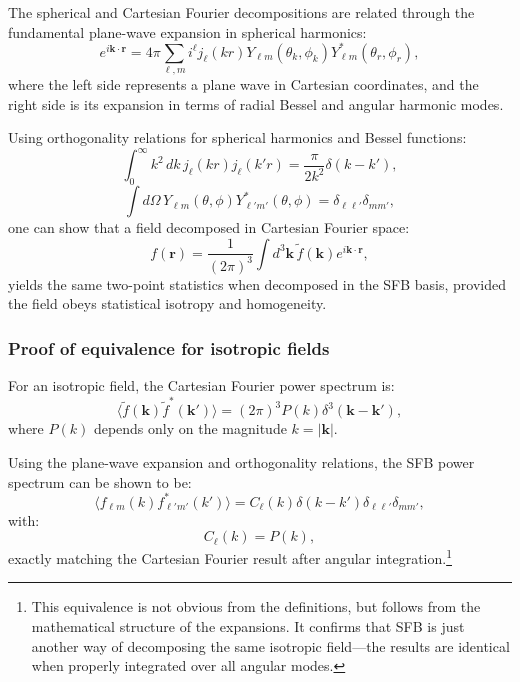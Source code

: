 The spherical and Cartesian Fourier decompositions are related through the fundamental plane-wave expansion in spherical harmonics:
\begin{equation}
e^{i\mathbf{k} \cdot \mathbf{r}} = 4\pi \sum_{\ell,m} i^\ell j_\ell(kr) Y_{\ell m}(\theta_k, \phi_k) Y_{\ell m}^*(\theta_r, \phi_r),
\label{eq:plane_wave_expansion}
\end{equation}
where the left side represents a plane wave in Cartesian coordinates, and the right side is its expansion in terms of radial Bessel
and angular harmonic modes.

Using orthogonality relations for spherical harmonics and Bessel functions:
\begin{equation}
\int_0^\infty k^2 \, dk \, j_\ell(kr) j_\ell(k'r) = \frac{\pi}{2k^2} \delta(k - k'),
\label{eq:bessel_orthonormality}
\end{equation}
\begin{equation}
\int d\Omega \, Y_{\ell m}(\theta, \phi) Y_{\ell' m'}^*(\theta, \phi) = \delta_{\ell\ell'} \delta_{mm'},
\label{eq:harmonic_orthonormality}
\end{equation}
one can show that a field decomposed in Cartesian Fourier space:
\begin{equation}
f(\mathbf{r}) = \frac{1}{(2\pi)^3} \int d^3\mathbf{k} \, \tilde{f}(\mathbf{k}) e^{i\mathbf{k} \cdot \mathbf{r}},
\label{eq:cartesian_decomposition_proof}
\end{equation}
yields the same two-point statistics when decomposed in the SFB basis, provided the field obeys statistical isotropy and homogeneity.

\subsubsection{Proof of equivalence for isotropic fields}

For an isotropic field, the Cartesian Fourier power spectrum is:
\begin{equation}
\langle \tilde{f}(\mathbf{k}) \tilde{f}^*(\mathbf{k}') \rangle = (2\pi)^3 P(k) \delta^3(\mathbf{k} - \mathbf{k}'),
\label{eq:cartesian_power_isotropic}
\end{equation}
where $P(k)$ depends only on the magnitude $k = |\mathbf{k}|$.

Using the plane-wave expansion and orthogonality relations, the SFB power spectrum can be shown to be:
\begin{equation}
\langle f_{\ell m}(k) f_{\ell' m'}^*(k') \rangle = C_\ell(k) \delta(k - k') \delta_{\ell\ell'} \delta_{mm'},
\label{eq:sfb_power_from_cartesian}
\end{equation}
with:
\begin{equation}
C_\ell(k) = P(k),
\label{eq:sfb_equals_cartesian}
\end{equation}
exactly matching the Cartesian Fourier result after angular integration.\footnote{This equivalence is not obvious from the definitions,
but follows from the mathematical structure of the expansions. It confirms that SFB is just another way of decomposing the same
isotropic field—the results are identical when properly integrated over all angular modes.}

